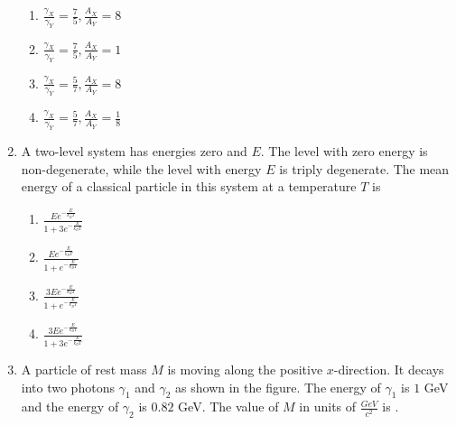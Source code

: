 \documentclass{article}
\begin{document}
\begin{enumerate}
    \begin{enumerate}
        \item $\frac{\gamma_X}{\gamma_Y} = \frac{7}{5}, \frac{A_X}{A_Y} = 8$
        \item $\frac{\gamma_X}{\gamma_Y} = \frac{7}{5}, \frac{A_X}{A_Y} = 1$
        \item $\frac{\gamma_X}{\gamma_Y} = \frac{5}{7}, \frac{A_X}{A_Y} = 8$
        \item $\frac{\gamma_X}{\gamma_Y} = \frac{5}{7}, \frac{A_X}{A_Y} = \frac{1}{8}$
    \end{enumerate}

    \item A two-level system has energies zero and $E$. The level with zero energy is non-degenerate, while the level with energy $E$ is triply degenerate. The mean energy of a classical particle in this system at a temperature $T$ is  


    \begin{enumerate}
        \item $\frac{Ee^{-\frac{E}{k_BT}}}{1+3e^{-\frac{E}{k_BT}}}$
        \item $\frac{Ee^{-\frac{E}{k_BT}}}{1+e^{-\frac{E}{k_BT}}}$
        \item $\frac{3Ee^{-\frac{E}{k_BT}}}{1+e^{-\frac{E}{k_BT}}}$
        \item $\frac{3Ee^{-\frac{E}{k_BT}}}{1+3e^{-\frac{E}{k_BT}}}$
    \end{enumerate}

 \item A particle of rest mass $M$ is moving along the positive $x$-direction. It decays into two photons $\gamma_1$ and $\gamma_2$ as shown in the figure. The energy of $\gamma_1$ is $1$ GeV and the energy of $\gamma_2$ is $0.82$ GeV. The value of $M$ in units of $\frac{GeV}{{c}^2}$ is  
 \underline{\hspace{2cm}}.

\begin{figure}[!ht]
\centering
{}%


\end{figure}
\end{enumerate}
\end{document}
